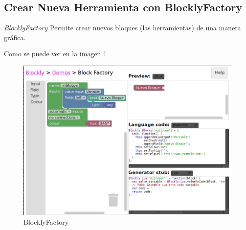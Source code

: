 \subsection{Crear Nueva Herramienta con BlocklyFactory}

\textit{BlocklyFactory} Permite crear nuevos bloques (las herramientas) 
de una manera gráfica.

Como se puede ver en la imagen \ref{fig:blocklyfactory}

\onecolumn

\begin{figure}[hptp]
    \centering
    \includegraphics[scale=0.4]{imag/blocklyfactory.png}
    \caption{BlocklyFactory}
    \label{fig:blocklyfactory}
\end{figure}
\smallskip

\twocolumn
